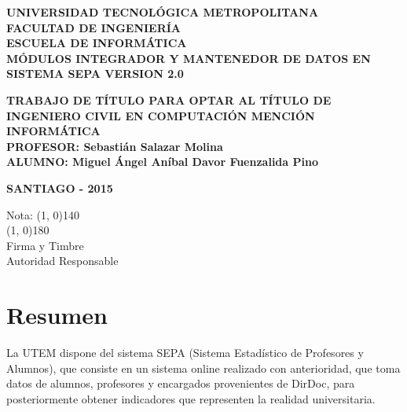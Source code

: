 \documentclass[a4paper,12pt,openany,oneside]{book}
\begin{document}

\begin{center}

\textbf{UNIVERSIDAD TECNOLÓGICA METROPOLITANA\\
FACULTAD DE INGENIERÍA\\
ESCUELA DE INFORMÁTICA}\\
\vspace{3cm}
\textbf{MÓDULOS INTEGRADOR Y MANTENEDOR DE DATOS EN SISTEMA SEPA VERSION 2.0}
\end{center}
\begin{flushright}
\textbf{TRABAJO DE TÍTULO PARA OPTAR AL TÍTULO DE\\
INGENIERO CIVIL EN COMPUTACIÓN MENCIÓN INFORMÁTICA\\}
\vspace{3cm}
\textbf{PROFESOR: Sebastián Salazar Molina\\}
\vspace{1.5cm}
\textbf{ALUMNO: Miguel Ángel Aníbal Davor Fuenzalida Pino}
\end{flushright}
\vspace{4cm}
\begin{center}
\textbf{SANTIAGO - 2015}
\end{center}
\newpage
\thispagestyle{empty}
\begin{flushright}
\vspace{20mm}
Nota: \line(1, 0){140} \\
\vspace{30 mm}
\line(1, 0){180}\\	
Firma y Timbre\\
Autoridad Responsable
\end{flushright}
\chapter*{Resumen}
\thispagestyle{empty}

La UTEM dispone del sistema SEPA (Sistema Estadístico de Profesores y Alumnos), que consiste en un sistema online realizado con anterioridad, que toma datos de alumnos, profesores y encargados provenientes de DirDoc, para posteriormente obtener indicadores que representen la realidad universitaria.
\end{document}
